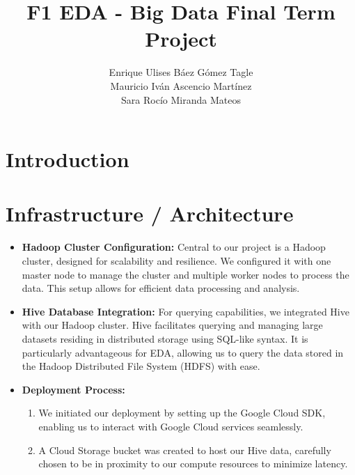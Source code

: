 \documentclass{article}
\begin{document}
\title{F1 EDA - Big Data Final Term Project}

\author{Enrique Ulises Báez Gómez Tagle \\ Mauricio Iván Ascencio Martínez\\ Sara Rocío Miranda Mateos}

\maketitle

\begin{abstract}

\end{abstract}

\tableofcontents
\newpage

\section{Introduction}


\section{Infrastructure / Architecture}


\begin{itemize}
    \item \textbf{Hadoop Cluster Configuration:} Central to our project is a Hadoop cluster, designed for scalability and resilience. We configured it with one master node to manage the cluster and multiple worker nodes to process the data. This setup allows for efficient data processing and analysis.
    
    \item \textbf{Hive Database Integration:} For querying capabilities, we integrated Hive with our Hadoop cluster. Hive facilitates querying and managing large datasets residing in distributed storage using SQL-like syntax. It is particularly advantageous for EDA, allowing us to query the data stored in the Hadoop Distributed File System (HDFS) with ease.

    \item \textbf{Deployment Process:}
        \begin{enumerate}
            \item We initiated our deployment by setting up the Google Cloud SDK, enabling us to interact with Google Cloud services seamlessly.
            \item A Cloud Storage bucket was created to host our Hive data, carefully chosen to be in proximity to our compute resources to minimize latency.
        \end{enumerate}
\end{itemize}
\end{document}
